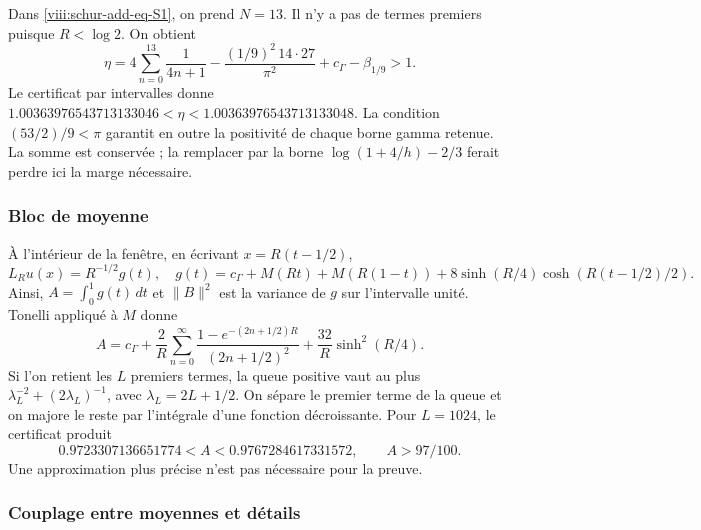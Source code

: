 Dans \eqref{viii:schur-add-eq-S1}, on prend \(N=13\). Il n'y a pas de termes premiers puisque \(R<\log2\). On obtient
\begin{equation}
\eta=4\sum_{n=0}^{13}\frac1{4n+1}
-\frac{(1/9)^2\,14\cdot27}{\pi^2}+c_\Gamma-\beta_{1/9}>1.
\label{viii:schur-add-eq-S9}
\end{equation}
Le certificat par intervalles donne
\(1.00363976543713133046<\eta<1.00363976543713133048\).
La condition \((53/2)/9<\pi\) garantit en outre la positivité de
chaque borne gamma retenue. La somme est conservée ; la remplacer par la
borne \(\log(1+4/h)-2/3\) ferait perdre ici la marge nécessaire.

\subsubsection{Bloc de moyenne}
\label{viii:schur-add-sub-269}

À l'intérieur de la fenêtre, en écrivant \(x=R(t-1/2)\),
\begin{equation}
L_Ru(x)=R^{-1/2}g(t),\quad
g(t)=c_\Gamma+M(Rt)+M(R(1-t))
+8\sinh(R/4)\cosh(R(t-1/2)/2).
\label{viii:schur-add-display-22}
\end{equation}
Ainsi, \(A=\int_0^1g(t)\,dt\) et \(\|B\|^2\) est la variance
de \(g\) sur l'intervalle unité. Tonelli appliqué à \(M\) donne
\begin{equation}
A=c_\Gamma+\frac2R\sum_{n=0}^\infty
\frac{1-e^{-(2n+1/2)R}}{(2n+1/2)^2}
+\frac{32}R\sinh^2(R/4).
\label{viii:schur-add-eq-S10}
\end{equation}
Si l'on retient les \(L\) premiers termes, la queue positive vaut au plus \(\lambda_L^{-2}+(2\lambda_L)^{-1}\), avec \(\lambda_L=2L+1/2\). On sépare le premier terme de la queue et on majore le reste par l'intégrale d'une fonction décroissante. Pour \(L=1024\), le certificat produit
\begin{equation}
0.9723307136651774<A<0.9767284617331572,
\qquad A>97/100.
\label{viii:schur-add-eq-S11}
\end{equation}
Une approximation plus précise n'est pas nécessaire pour la preuve.

\subsubsection{Couplage entre moyennes et détails}
\label{viii:schur-add-sub-295}

